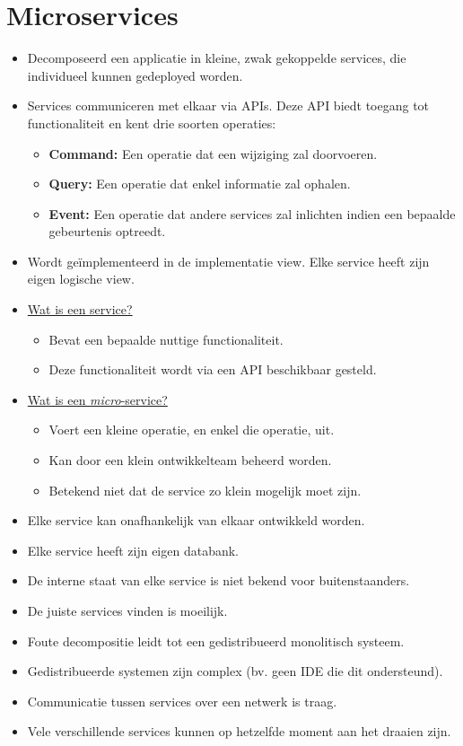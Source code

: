 	\section{Microservices}
		\begin{itemize}
			\item Decomposeerd een applicatie in kleine, zwak gekoppelde services, die individueel kunnen gedeployed worden.
			\item Services communiceren met elkaar via APIs. Deze API biedt toegang tot functionaliteit en kent drie soorten operaties:
			\begin{itemize}
				\item \textbf{Command:} Een operatie dat een wijziging zal doorvoeren.
				\item \textbf{Query:} Een operatie dat enkel informatie zal ophalen. 
				\item \textbf{Event:} Een operatie dat andere services zal inlichten indien een bepaalde gebeurtenis optreedt.
			\end{itemize}
			\item Wordt geïmplementeerd in de implementatie view. Elke service heeft zijn eigen logische view.
			\item \uline{Wat is een service?}
			\begin{itemize}
				\item Bevat een bepaalde nuttige functionaliteit.
				\item Deze functionaliteit wordt via een API beschikbaar gesteld. 
			\end{itemize}
			\item \uline{Wat is een \emph{micro}-service?}
			\begin{itemize}
				\item Voert een kleine operatie, en enkel die operatie, uit. 
				\item Kan door een klein ontwikkelteam beheerd worden.
				\item[\alert] Betekend niet dat de service zo klein mogelijk moet zijn.
			\end{itemize}
			\item[\good] Elke service kan onafhankelijk van elkaar ontwikkeld worden.
			\item[\good] Elke service heeft zijn eigen databank.
			\item[\good] De interne staat van elke service is niet bekend voor buitenstaanders. 
			\item[\alert] De juiste services vinden is moeilijk.
			\item[\alert] Foute decompositie leidt tot een gedistribueerd monolitisch systeem.
			\item[\alert] Gedistribueerde systemen zijn complex (bv. geen IDE die dit ondersteund).
			\item[\alert] Communicatie tussen services over een netwerk is traag.
			\item[\alert] Vele verschillende services kunnen op hetzelfde moment aan het draaien zijn. 
		\end{itemize}

